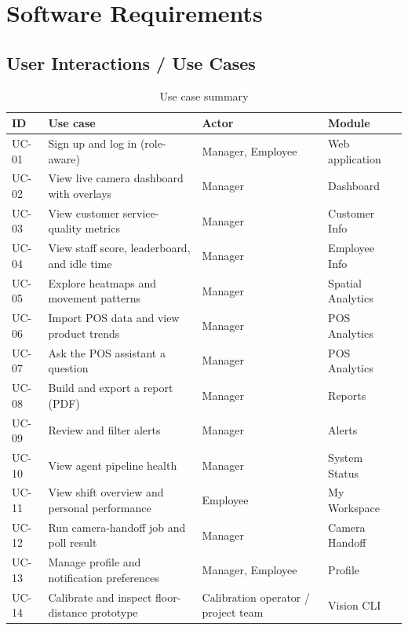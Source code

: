 \chapter{Software Requirements}
\label{ch:req}
\section{User Interactions / Use Cases}
\begin{longtable}{P{0.09\textwidth}P{0.4\textwidth}P{0.17\textwidth}P{0.2\textwidth}}
\caption{Use case summary}\\
\toprule
ID & Use case & Actor & Module\\
\midrule
\endhead
UC-01 & Sign up and log in (role-aware) & Manager, Employee & Web application\\
UC-02 & View live camera dashboard with overlays & Manager & Dashboard\\
UC-03 & View customer service-quality metrics & Manager & Customer Info\\
UC-04 & View staff score, leaderboard, and idle time & Manager & Employee Info\\
UC-05 & Explore heatmaps and movement patterns & Manager & Spatial Analytics\\
UC-06 & Import POS data and view product trends & Manager & POS Analytics\\
UC-07 & Ask the POS assistant a question & Manager & POS Analytics\\
UC-08 & Build and export a report (PDF) & Manager & Reports\\
UC-09 & Review and filter alerts & Manager & Alerts\\
UC-10 & View agent pipeline health & Manager & System Status\\
UC-11 & View shift overview and personal performance & Employee & My Workspace\\
UC-12 & Run camera-handoff job and poll result & Manager & Camera Handoff\\
UC-13 & Manage profile and notification preferences & Manager, Employee & Profile\\
UC-14 & Calibrate and inspect floor-distance prototype & Calibration operator / project team & Vision CLI\\
\bottomrule
\end{longtable}

